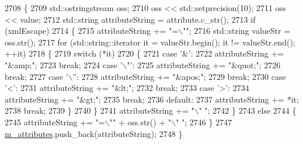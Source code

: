 \begin{DoxyCode}
2708 \{
2709         std::ostringstream oss;
2710         oss << std::setprecision(10);
2711         oss << value;
2712         std::string attributeString = attribute.c\_str();
2713         \textcolor{keywordflow}{if} (xmlEscape)
2714         \{
2715                 attributeString += \textcolor{stringliteral}{"=\(\backslash\)""};
2716                 std::string valueStr = oss.str();
2717                 \textcolor{keywordflow}{for} (std::string::iterator it = valueStr.begin(); it != valueStr.end(); ++it)
2718                 \{
2719                         \textcolor{keywordflow}{switch} (*it)
2720                         \{
2721                         \textcolor{keywordflow}{case} \textcolor{charliteral}{'&'}:
2722                                 attributeString += \textcolor{stringliteral}{"&amp;"};
2723                                 \textcolor{keywordflow}{break};
2724                         \textcolor{keywordflow}{case} \textcolor{charliteral}{'\(\backslash\)"'}:
2725                                 attributeString += \textcolor{stringliteral}{"&quot;"};
2726                                 \textcolor{keywordflow}{break};
2727                         \textcolor{keywordflow}{case} \textcolor{charliteral}{'\(\backslash\)''}:
2728                                 attributeString += \textcolor{stringliteral}{"&apos;"};
2729                                 \textcolor{keywordflow}{break};
2730                         \textcolor{keywordflow}{case} \textcolor{charliteral}{'<'}:
2731                                 attributeString += \textcolor{stringliteral}{"&lt;"};
2732                                 \textcolor{keywordflow}{break};
2733                         \textcolor{keywordflow}{case} \textcolor{charliteral}{'>'}:
2734                                 attributeString += \textcolor{stringliteral}{"&gt;"};
2735                                 \textcolor{keywordflow}{break};
2736                         \textcolor{keywordflow}{default}:
2737                                 attributeString += *it;
2738                                 \textcolor{keywordflow}{break};
2739                         \}
2740                 \}
2741                 attributeString += \textcolor{stringliteral}{"\(\backslash\)" "};
2742         \}
2743         \textcolor{keywordflow}{else}
2744         \{
2745                 attributeString += \textcolor{stringliteral}{"=\(\backslash\)""} + oss.str() + \textcolor{stringliteral}{"\(\backslash\)" "};
2746         \}
2747         \hyperlink{classns3_1_1AnimationInterface_1_1AnimXmlElement_a9f5e8e7ead9145810f613ffc189ac291}{m\_attributes}.push\_back(attributeString);
2748 \}
\end{DoxyCode}


